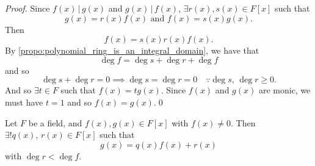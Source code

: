 \begin{proof}
  Since $f(x) \, | \, g(x)$ and $g(x) \, | \, f(x)$, $\exists r(x), s(x) \in F[x]$ such that
  \begin{equation*}
    g(x) = r(x) f(x) \text{ and } f(x) = s(x) g(x).
  \end{equation*}
  Then
  \begin{equation*}
    f(x) = s(x) r(x) f(x).
  \end{equation*}
  By \cref{propo:polynomial_ring_is_an_integral_domain}, we have that
  \begin{equation*}
    \deg f = \deg s + \deg r + \deg f
  \end{equation*}
  and so
  \begin{equation*}
    \deg s + \deg r = 0 \implies \deg s = \deg r = 0 \quad \because \deg s, \, \deg r \geq 0.
  \end{equation*}
  And so $\exists t \in F$ such that $f(x) = tg(x)$. Since $f(x)$ and $g(x)$ are monic, we must have $t = 1$ and so $f(x) = g(x)$.\qed
\end{proof}

\begin{propo}
\label{propo:division_algorithm_for_polynomials}
  Let $F$ be a field, and $f(x), g(x) \in F[x]$ with $f(x) \neq 0$. Then $\exists ! q(x), \, r(x) \in F[x]$ such that
  \begin{equation*}
    g(x) = q(x) f(x) + r(x)
  \end{equation*}
  with $\deg r < \deg f$.
\end{propo}

